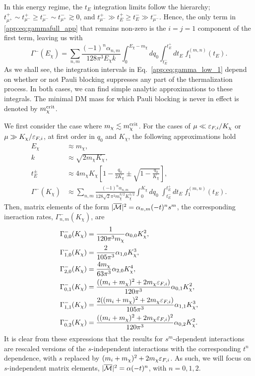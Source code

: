 In this energy regime,  the $t_E$ integration limits follow the hierarchy; $t_{\mu^{+}}^{+} \sim t_{\mu^{-}}^{+} \ge t_{\mu^{-}}^{-} \sim t_{\mu^{+}}^{-} \gtrsim 0$, and $t_{\mu^{-}}^{+} \gg t_E^+ \ge t_E^- \gg t_{\mu^{-}}^{-}$. Hence, the only term in \ref{app:eq:gammafull_app} that remains non-zero is the $i=j=1$ component of the first term, leaving us with
\begin{equation}
    \Gamma^-(E_\chi) = \sum_{n,m}  \frac{(-1)^n \alpha_{n,m}}{128\pi^3 E_\chi k }\int_0^{E_\chi -m_\chi} dq_0\int_{t_E^-}^{t_E^+} d t_E\; f_1^{(m,n)}(t_E).
    \label{app:eq:gamma_low_1}
\end{equation}
As we shall see, the integration intervals in Eq.~\ref{app:eq:gamma_low_1} depend on whether or not Pauli blocking suppresses any part of the thermalization process.
In both cases, we can find simple analytic approximations to these integrals. 
The minimal DM mass for which Pauli blocking is never in effect is denoted by $m_\chi^{\rm crit}$. 



We first consider the case where $m_\chi \lesssim m_\chi^{\rm crit}$. 
For the cases of $\mu \ll \varepsilon_{F,i}/K_\chi$ or $\mu \gg K_\chi/\varepsilon_{F,i}$, at first order in $q_0$ and $K_\chi$, the following approximations hold
\begin{align}
    E_\chi &\approx m_\chi,\\
    k &\approx \sqrt{2m_\chi K_\chi},\\
    t_E^\pm &\approx 4m_\chi K_\chi \left[ 1 - \frac{q_0}{2 K_\chi}\pm \sqrt{1 - \frac{q_0}{K_\chi}} \right],\\
    \Gamma^- (K_\chi) & \approx \sum_{n,m}\frac{(-1)^n \alpha_{n,m}}{128\sqrt{2} \pi^3 m_\chi^{3/2}K_\chi^{1/2}}\int_0^{K_\chi} dq_0\;\int_{t_E^-}^{t_E^+} dt_E\;f_1^{(m,n)}(t_E).
    \label{app:eq:gamma_low_2}
\end{align}
Then, matrix elements of the form $|\overline{\mathcal M}|^2 = \alpha_{n,m} (-t)^n s^m$, the corresponding ineraction rates, $\Gamma_{n,m}^-(K_\chi)$, are
\begin{align}
    \Gamma^-_{0,0}(K_\chi) & = \frac{1}{120\pi^3 m_\chi}\alpha_{0,0} K_\chi^2,\label{app:eq:gamman0}\\
    \Gamma^-_{1,0}(K_\chi) & = \frac{2}{105\pi^3}\alpha_{1,0}K_\chi^3,\label{app:eq:gamman1}\\
    \Gamma^-_{2,0}(K_\chi) & = \frac{4m_\chi}{63\pi^3}\alpha_{2,0}K_\chi^4,\label{app:eq:gamman2}\\
    \Gamma^-_{0,1}(K_\chi) & = \frac{((m_i + m_\chi)^2 + 2m_\chi \varepsilon_{F,i})}{120\pi^3}\alpha_{0,1}K_\chi^2,\\
    \Gamma^-_{1,1}(K_\chi) & = \frac{2((m_i + m_\chi)^2 + 2m_\chi \varepsilon_{F,i})}{105\pi^3}\alpha_{1,1}K_\chi^3,\\
    \Gamma^-_{0,2}(K_\chi) & = \frac{((m_i + m_\chi)^2 + 2m_\chi \varepsilon_{F,i})^2}{120\pi^3}\alpha_{0,2}K_\chi^2.
\end{align}
It is clear from these expressions that the results for $s^m$-dependent interactions are rescaled versions of the $s$-independent interactions with the corresponding $t^n$ dependence, with $s$ replaced by $(m_i + m_\chi)^2 + 2 m_\chi \varepsilon_{F,i}$. As such, we will focus on $s$-independent matrix elements, $|\overline{\mathcal M}|^2 = \alpha (-t)^n$, with $n= 0, 1, 2$.

